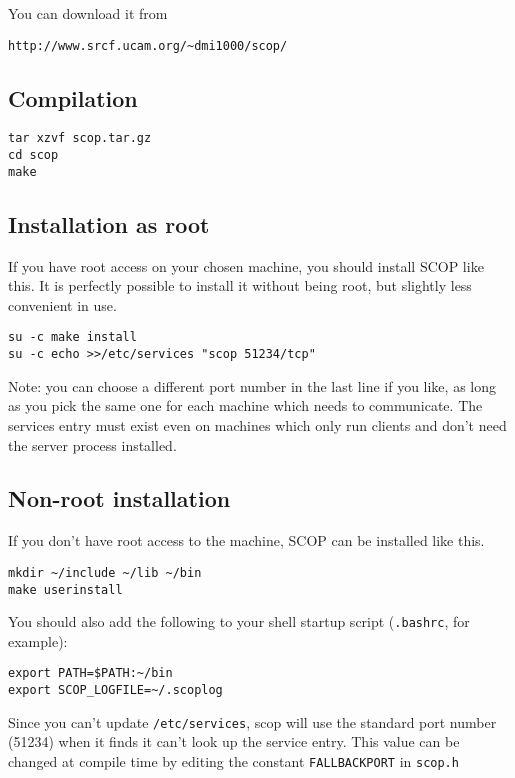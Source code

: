 \documentclass[12pt,a4paper,twoside]{article}
\renewcommand{\_}{\texttt{\symbol{95}}}
\begin{document}
You can download it from

\verb=http://www.srcf.ucam.org/~dmi1000/scop/=

\subsection{Compilation}

\begin{verbatim}
tar xzvf scop.tar.gz
cd scop
make
\end{verbatim}

\subsection{Installation as root}

If you have root access on your chosen machine, you should
install SCOP like this. It is perfectly possible to install
it without being root, but slightly less convenient in use.

\begin{verbatim}
su -c make install
su -c echo >>/etc/services "scop 51234/tcp"
\end{verbatim}

Note: you can choose a different port number in the last line if you
like, as long as you pick the same one for each machine which needs to
communicate. The services entry must exist even on machines which
only run clients and don't need the server process installed.

\subsection{Non-root installation}

If you don't have root access to the machine, SCOP can be
installed like this.

\begin{verbatim}
mkdir ~/include ~/lib ~/bin
make userinstall
\end{verbatim}

You should also add the following to your shell startup script
(\texttt{.bashrc}, for example):

\begin{verbatim}
export PATH=$PATH:~/bin
export SCOP_LOGFILE=~/.scoplog
\end{verbatim}

Since you can't update \texttt{/etc/services}, scop will use the
standard port number (51234) when it finds it can't look up the service
entry. This value can be changed at compile time by editing the
constant \texttt{FALLBACK\_PORT} in \texttt{scop.h}
\end{document}
